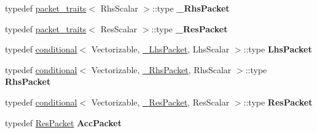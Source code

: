 \begin{DoxyCompactItemize}
typedef \hyperlink{struct_eigen_1_1internal_1_1packet__traits}{packet\+\_\+traits}$<$ Rhs\+Scalar $>$\+::type {\bfseries \+\_\+\+Rhs\+Packet}
\item 
\mbox{\label{class_eigen_1_1internal_1_1gebp__traits_a702b198d941cbde47773b3ae27f75d3e}} 
typedef \hyperlink{struct_eigen_1_1internal_1_1packet__traits}{packet\+\_\+traits}$<$ Res\+Scalar $>$\+::type {\bfseries \+\_\+\+Res\+Packet}
\item 
\mbox{\label{class_eigen_1_1internal_1_1gebp__traits_a1a6611c59fbecd0ad3feae882714521e}} 
typedef \hyperlink{struct_eigen_1_1internal_1_1conditional}{conditional}$<$ Vectorizable, \hyperlink{group___sparse_core___module}{\+\_\+\+Lhs\+Packet}, Lhs\+Scalar $>$\+::type {\bfseries Lhs\+Packet}
\item 
\mbox{\label{class_eigen_1_1internal_1_1gebp__traits_add54f631fcf0e21420054b51d0f2c888}} 
typedef \hyperlink{struct_eigen_1_1internal_1_1conditional}{conditional}$<$ Vectorizable, \hyperlink{group___sparse_core___module}{\+\_\+\+Rhs\+Packet}, Rhs\+Scalar $>$\+::type {\bfseries Rhs\+Packet}
\item 
\mbox{\label{class_eigen_1_1internal_1_1gebp__traits_a104675cab0d5615df1fd429b077a98e7}} 
typedef \hyperlink{struct_eigen_1_1internal_1_1conditional}{conditional}$<$ Vectorizable, \hyperlink{group___sparse_core___module}{\+\_\+\+Res\+Packet}, Res\+Scalar $>$\+::type {\bfseries Res\+Packet}
\item 
\mbox{\label{class_eigen_1_1internal_1_1gebp__traits_ad1a9a705dd13f8f610e958c4e2ca0f2a}} 
typedef \hyperlink{class_eigen_1_1internal_1_1_tensor_lazy_evaluator_writable}{Res\+Packet} {\bfseries Acc\+Packet}
\end{DoxyCompactItemize}
